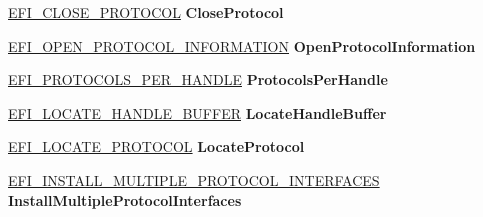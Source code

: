 \begin{DoxyCompactItemize}
\item 
\mbox{\label{struct_e_f_i___b_o_o_t___s_e_r_v_i_c_e_s_a8cb00458dcceb3cccaf8d3b788e5e90b}} 
\hyperlink{_uefi_spec_8h_a008f531d3228b8bd9d2caefab2b221c2}{E\+F\+I\+\_\+\+C\+L\+O\+S\+E\+\_\+\+P\+R\+O\+T\+O\+C\+OL} {\bfseries Close\+Protocol}
\item 
\mbox{\label{struct_e_f_i___b_o_o_t___s_e_r_v_i_c_e_s_a466b02766ebcede29d322ac778c02e4e}} 
\hyperlink{_uefi_spec_8h_a07ed9d9f8b9ffa0ce041e82563f9d189}{E\+F\+I\+\_\+\+O\+P\+E\+N\+\_\+\+P\+R\+O\+T\+O\+C\+O\+L\+\_\+\+I\+N\+F\+O\+R\+M\+A\+T\+I\+ON} {\bfseries Open\+Protocol\+Information}
\item 
\mbox{\label{struct_e_f_i___b_o_o_t___s_e_r_v_i_c_e_s_a64affe6e2ab0e56fb6f68349b5b01edb}} 
\hyperlink{_uefi_spec_8h_a4d8302604517bb73a9f57ed85a2c056e}{E\+F\+I\+\_\+\+P\+R\+O\+T\+O\+C\+O\+L\+S\+\_\+\+P\+E\+R\+\_\+\+H\+A\+N\+D\+LE} {\bfseries Protocols\+Per\+Handle}
\item 
\mbox{\label{struct_e_f_i___b_o_o_t___s_e_r_v_i_c_e_s_adad462c40d11ca8e6d606c4a05e61276}} 
\hyperlink{_uefi_spec_8h_a16b617fafa7624ee2460beae83fe69bc}{E\+F\+I\+\_\+\+L\+O\+C\+A\+T\+E\+\_\+\+H\+A\+N\+D\+L\+E\+\_\+\+B\+U\+F\+F\+ER} {\bfseries Locate\+Handle\+Buffer}
\item 
\mbox{\label{struct_e_f_i___b_o_o_t___s_e_r_v_i_c_e_s_a7aa4a4aae180d2bc65c1ecae0c31c0bc}} 
\hyperlink{_uefi_spec_8h_ad08f905d14a840760564de80cbef93fb}{E\+F\+I\+\_\+\+L\+O\+C\+A\+T\+E\+\_\+\+P\+R\+O\+T\+O\+C\+OL} {\bfseries Locate\+Protocol}
\item 
\mbox{\label{struct_e_f_i___b_o_o_t___s_e_r_v_i_c_e_s_a868bcf9ab5968f76af2f24dc24c79970}} 
\hyperlink{_uefi_spec_8h_a8f07efa92b97aba461dd125c132214c3}{E\+F\+I\+\_\+\+I\+N\+S\+T\+A\+L\+L\+\_\+\+M\+U\+L\+T\+I\+P\+L\+E\+\_\+\+P\+R\+O\+T\+O\+C\+O\+L\+\_\+\+I\+N\+T\+E\+R\+F\+A\+C\+ES} {\bfseries Install\+Multiple\+Protocol\+Interfaces}
\item 
\mbox{\label{struct_e_f_i___b_o_o_t___s_e_r_v_i_c_e_s_a73f6c0cde1ce421ccaefc548525c2113}} 

\end{DoxyCompactItemize}
